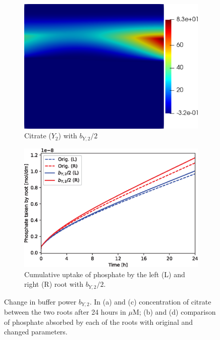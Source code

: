 \documentclass[11pt]{article}
\numberwithin{equation}{section}
\begin{document}
\begin{figure}[!htb]
\begin{subfigure}[t]{0.35\textwidth}
    \includegraphics[width=\textwidth]{Figures/Y2_bY2divby2.png}
    \caption{Citrate ($Y_2$) with $b_{Y,2} / 2$}
    \label{fig:numexp_by2down1}
\end{subfigure}
\hspace{1cm}
\begin{subfigure}[t]{0.4\textwidth}
    \includegraphics[width=\textwidth]{Figures/bY2divby2.eps}
    \caption{Cumulative uptake of phosphate by the left (L) and right (R) root with $b_{Y,2} / 2$.}
    \label{fig:numexp_by2down2}
\end{subfigure}
\caption{Change in buffer power $b_{Y,2}$. In (a) and (c) concentration of citrate between the two roots after 24 hours in $\mu$M; (b) and (d) comparison of phosphate absorbed by each of the roots with original and changed parameters.}
\end{figure}
\end{document}
